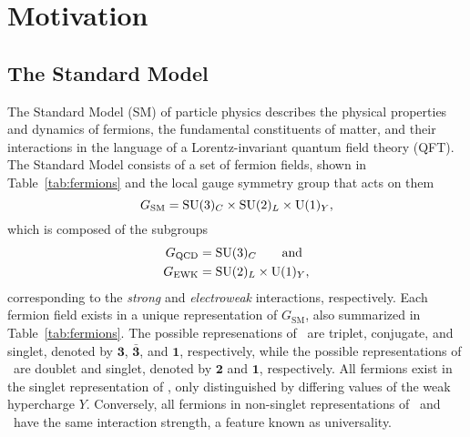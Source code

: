 \chapter{Motivation}


\section{The Standard Model}
\label{sec:sm}

The Standard Model (SM) of particle physics describes the physical properties and dynamics of fermions, the fundamental constituents of matter, and their interactions in the language of a Lorentz-invariant quantum field theory (QFT).
The Standard Model consists of a set of fermion fields, shown in Table~\ref{tab:fermions} and the local gauge symmetry group that acts on them
\begin{equation}
  G_{\text{SM}} = \text{SU}(3)_C \times \text{SU}(2)_L \times \text{U}(1)_Y,
\end{equation}
which is composed of the subgroups
\begin{align}
  G_{\text{QCD}} & = \text{SU}(3)_C \qquad \text{and} \\
  G_{\text{EWK}} & = \text{SU}(2)_L \times \text{U}(1)_Y,
\end{align}
corresponding to the \textit{strong} and \textit{electroweak} interactions, respectively.
Each fermion field exists in a unique representation of $G_{\text{SM}}$, also summarized in Table~\ref{tab:fermions}.
The possible represenations of \suthree\ are triplet, conjugate, and singlet, denoted by $\mathbf{3}$, $\mathbf{\bar{3}}$, and $\mathbf{1}$, respectively, while the possible representations of \sutwo\ are doublet and singlet, denoted by $\mathbf{2}$ and $\mathbf{1}$, respectively.
All fermions exist in the singlet representation of \uone, only distinguished by differing values of the weak hypercharge $Y$.
Conversely, all fermions in non-singlet representations of \suthree\ and \sutwo\ have the same interaction strength, a feature known as universality.

